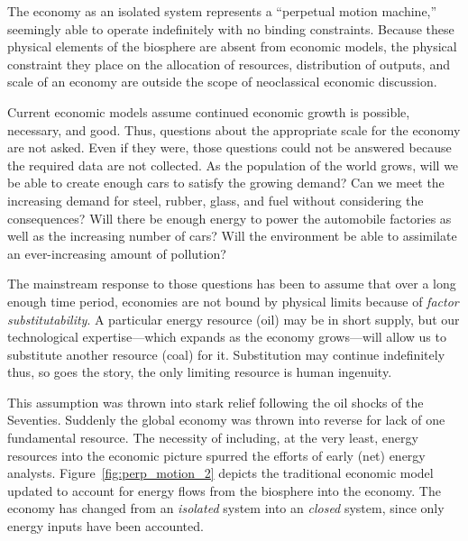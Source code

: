 The economy as an isolated system
represents a ``perpetual motion machine,'' %
seemingly able to operate indefinitely with 
no binding constraints.
Because these physical elements of the biosphere are absent from economic models,
the physical constraint they place on the allocation of resources, distribution of outputs, and 
scale of an economy are outside the scope of neoclassical economic discussion.

Current economic models assume
continued economic growth is possible, 
necessary, and good. Thus, questions about
the appropriate scale for the economy 
are not asked. Even if they were, those questions
could not be answered because the
required data are not collected. 
As the population of the world grows, will we 
be able to create enough cars to satisfy the growing demand?
Can we meet the increasing demand for steel, rubber, glass,
and fuel without considering the consequences? 
Will there be enough energy to power the 
automobile factories as 
well as the increasing number of cars? Will the 
environment be able to assimilate an ever-increasing 
amount of pollution?



The mainstream response to those questions
has been to assume that over a long enough
time period, economies are not bound by physical 
limits because of \emph{factor substitutability}.
A particular energy resource (oil) may be in short supply,
but our technological expertise---which expands
as the economy grows---will allow us to substitute
another resource (coal) for it.
Substitution may continue indefinitely thus, so
goes the story,
the only limiting resource is
human ingenuity.\cite{Simon1981, Simon1998}

This assumption was thrown into stark relief following the oil
shocks of the Seventies.
Suddenly the global economy was thrown
into reverse for lack of one fundamental resource.
The necessity of including,
at the very least,
energy resources into the economic picture
spurred the efforts of early (net) energy 
analysts.\cite{Gilliland1975, Chapman1976}
Figure~\ref{fig:perp_motion_2} depicts the traditional
economic model updated to account for 
energy flows from the biosphere
into the economy.
The economy has changed from an \emph{isolated}
system into an \emph{closed} system,
since only energy inputs have been accounted.

